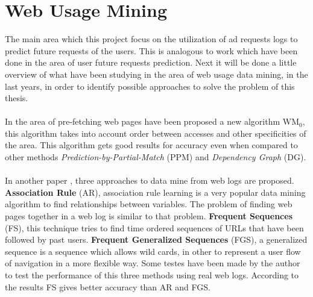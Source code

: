 \section{Web Usage Mining}\label{sec:network}

\nocite{UjwalaPatil}

The main area which this project focus on the utilization of ad requests logs
to predict future requests of the users. This is analogous to work
which have been done in the area of user future requests prediction.
Next it will be done a little overview of what have been studying in the area of web
usage data mining, in the last years, in order to identify possible approaches
to solve the problem of this thesis.

\paragraph{}

In the area of pre-fetching web pages \cite{Nanopoulos01effectiveprediction} have
been proposed a new algorithm WM\begin{math}_0\end{math}, this algorithm takes into
account order between accesses and other specificities of the area. This
algorithm gets good results for accuracy even when compared to other methods
\emph{Prediction-by-Partial-Match} (PPM) and \emph{Dependency Graph} (DG).

\paragraph{}

In another paper \cite{Gery:2003:EWU:956699.956716}, three approaches to
data mine from web logs are proposed. \textbf{Association Rule} (AR), association rule
learning is a very popular data mining algorithm to find relationships between
variables. The problem of finding web pages together in a web log is similar to
that problem. \textbf{Frequent Sequences} (FS), this technique tries to find time
ordered sequences of URLs that have been followed by past users.
\textbf{Frequent Generalized Sequences} (FGS), a generalized sequence is a
sequence which allows wild cards, in other to represent a user flow of
navigation in a more flexible way. 
Some testes have been made by the author \cite{Gery:2003:EWU:956699.956716} to
test the performance of this three methods using real web logs. According to the
results FS gives better accuracy than AR and FGS.

